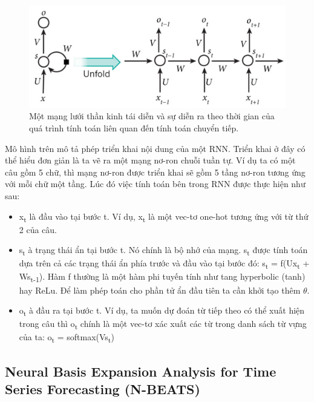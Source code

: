 \documentclass[conference]{IEEEtran}
\begin{document}
\begin{figure}[H]
    \centering
    \begin{minipage}{0.23\textwidth}
        \centering
        \includegraphics[width=1\textwidth]{bibliography/figure/RNN/RNN.pdf}
        \caption{Một mạng lưới thần kinh tái diễn và sự diễn ra theo thời gian của quá trình tính toán liên quan đến tính toán chuyển tiếp.}
        \label{fig:RNN}
    \end{minipage}

\end{figure}

Mô hình trên mô tả phép triển khai nội dung của một RNN. Triển khai ở đây có thể hiểu đơn giản là ta vẽ ra một mạng nơ-ron chuỗi tuần tự. Ví dụ ta có một câu gồm 5 chữ, thì mạng nơ-ron được triển khai sẽ gồm 5 tầng nơ-ron tương ứng với mỗi chữ một tầng. Lúc đó việc tính toán bên trong RNN được thực hiện như sau:
\begin{itemize}
    \item x\textsubscript{t} là đầu vào tại bước t. Ví dụ, x\textsubscript{t} là một vec-tơ one-hot tương ứng với từ thứ 2 của câu.
    \item s\textsubscript{t} à trạng thái ẩn tại bước t. Nó chính là bộ nhớ của mạng. s\textsubscript{t} được tính toán dựa trên cả các trạng thái ẩn phía trước và đầu vào tại bước đó: s\textsubscript{t} = f(Ux\textsubscript{t} +  Ws\textsubscript{t-1}). Hàm f thường là một hàm phi tuyến tính như tang hyperbolic (tanh) hay ReLu. Để làm phép toán cho phần tử ẩn đầu tiên ta cần khởi tạo thêm \(\theta \).
    \item o\textsubscript{t} à đầu ra tại bước t. Ví dụ, ta muốn dự đoán từ tiếp theo có thể xuất hiện trong câu thì o\textsubscript{t} chính là một vec-tơ xác xuất các từ trong danh sách từ vựng của ta: o\textsubscript{t} = softmax(Vs\textsubscript{t})
\end{itemize}

\subsection{Neural Basis Expansion Analysis for Time Series Forecasting (N-BEATS)}
\vspace{1mm}
\end{document}
